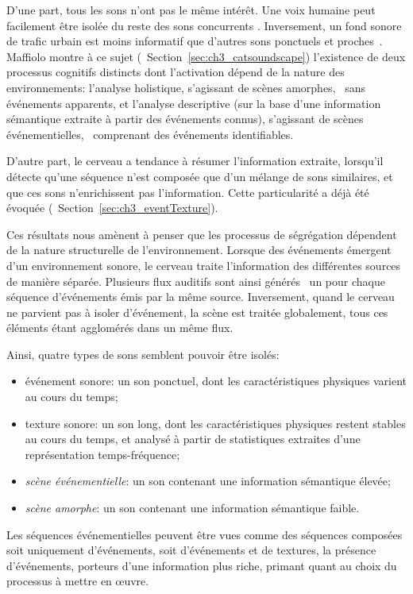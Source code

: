 D'une part, tous les sons n'ont pas le même intérêt. Une voix humaine peut facilement être isolée du reste des sons concurrents \citep{carlyon2004brain}. Inversement, un fond sonore de trafic urbain est moins informatif que d'autres sons ponctuels et proches~\citep{southworth1969sonic}.
Maffiolo montre à ce sujet (\cf~Section~\ref{sec:ch3_catsoundscape}) l'existence de deux processus cognitifs distincts dont l'activation dépend de la nature des environnements: l'analyse holistique, s'agissant de scènes amorphes, \ie~sans événements apparents, et l'analyse descriptive (sur la base d'une information sémantique extraite à partir des événements connus), s'agissant de scènes événementielles, \ie~comprenant des événements identifiables.

D'autre part, le cerveau a tendance à résumer l'information extraite, lorsqu'il détecte qu'une séquence n'est composée que d'un mélange de sons similaires, et que ces sons n'enrichissent pas l'information. Cette particularité a déjà été évoquée (\cf~Section~\ref{sec:ch3_eventTexture}). 

Ces résultats nous amènent à penser que les processus de ségrégation dépendent de la nature structurelle de l'environnement. Lorsque des événements émergent d'un environnement sonore, le cerveau traite l'information des différentes sources de manière séparée. Plusieurs flux auditifs sont ainsi générés \ie~un pour chaque séquence d'événements émis par la même source. Inversement, quand le cerveau ne parvient pas à isoler d'événement, la scène est traitée globalement, tous ces éléments étant agglomérés dans un même flux.

Ainsi, quatre types de sons semblent pouvoir être isolés:

\begin{itemize}
\item {événement sonore}: un son ponctuel, dont les caractéristiques physiques varient au cours du temps;
\item {texture sonore}: un son long, dont les caractéristiques physiques restent stables au cours du temps, et analysé à partir de statistiques extraites d'une représentation temps-fréquence;
\item \emph{scène événementielle}: un son contenant une information sémantique élevée;
\item \emph{scène amorphe}: un son contenant une information sémantique faible.
\end{itemize}

Les séquences événementielles peuvent être vues comme des séquences composées soit uniquement d'événements, soit d'événements et de textures, la présence d'événements, porteurs d'une information plus riche, primant quant au choix du processus à mettre en œuvre.
 
